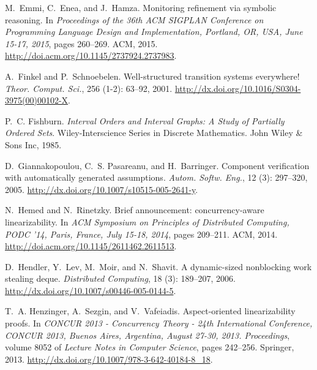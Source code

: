 \documentclass[9pt,natbib,authoryear]{sigplanconf}
\begin{document}
\begin{thebibliography}{26}
M.~Emmi, C.~Enea, and J.~Hamza.
\newblock Monitoring refinement via symbolic reasoning.
\newblock In \emph{Proceedings of the 36th {ACM} {SIGPLAN} Conference on
  Programming Language Design and Implementation, Portland, OR, USA, June
  15-17, 2015}, pages 260--269. {ACM}, 2015.
\newblock \url{http://doi.acm.org/10.1145/2737924.2737983}.

A.~Finkel and P.~Schnoebelen.
\newblock Well-structured transition systems everywhere!
\newblock \emph{Theor. Comput. Sci.}, 256 (1-2): 63--92,
  2001.
\newblock \url{http://dx.doi.org/10.1016/S0304-3975(00)00102-X}.

\newpage

P.~C. Fishburn.
\newblock \emph{Interval Orders and Interval Graphs: A Study of Partially
  Ordered Sets}.
\newblock Wiley-Interscience Series in Discrete Mathematics. John Wiley \& Sons
  Inc, 1985.

D.~Giannakopoulou, C.~S. Pasareanu, and H.~Barringer.
\newblock Component verification with automatically generated assumptions.
\newblock \emph{Autom. Softw. Eng.}, 12 (3): 297--320, 2005.
\newblock \url{http://dx.doi.org/10.1007/s10515-005-2641-y}.

N.~Hemed and N.~Rinetzky.
\newblock Brief announcement: concurrency-aware linearizability.
\newblock In \emph{{ACM} Symposium on Principles of Distributed Computing,
  {PODC} '14, Paris, France, July 15-18, 2014}, pages 209--211. {ACM}, 2014.
\newblock \url{http://doi.acm.org/10.1145/2611462.2611513}.

D.~Hendler, Y.~Lev, M.~Moir, and N.~Shavit.
\newblock A dynamic-sized nonblocking work stealing deque.
\newblock \emph{Distributed Computing}, 18 (3): 189--207,
  2006.
\newblock \url{http://dx.doi.org/10.1007/s00446-005-0144-5}.

T.~A. Henzinger, A.~Sezgin, and V.~Vafeiadis.
\newblock Aspect-oriented linearizability proofs.
\newblock In \emph{{CONCUR} 2013 - Concurrency Theory - 24th International
  Conference, {CONCUR} 2013, Buenos Aires, Argentina, August 27-30, 2013.
  Proceedings}, volume 8052 of \emph{Lecture Notes in Computer Science}, pages
  242--256. Springer, 2013.
\newblock \url{http://dx.doi.org/10.1007/978-3-642-40184-8_18}.


\end{thebibliography}
\end{document}
